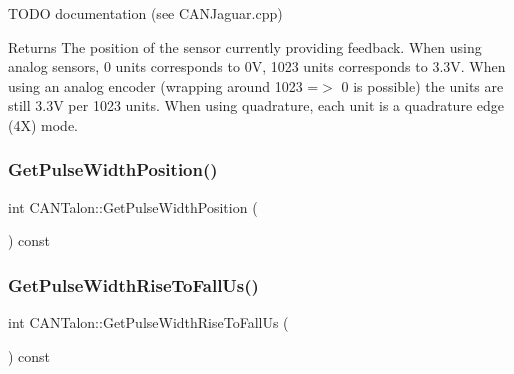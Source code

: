 T\+O\+DO documentation (see C\+A\+N\+Jaguar.\+cpp)

\begin{DoxyReturn}{Returns}
The position of the sensor currently providing feedback. When using analog sensors, 0 units corresponds to 0V, 1023 units corresponds to 3.\+3V. When using an analog encoder (wrapping around 1023 =$>$ 0 is possible) the units are still 3.\+3V per 1023 units. When using quadrature, each unit is a quadrature edge (4X) mode. 
\end{DoxyReturn}
\mbox{\label{class_c_a_n_talon_adf3c68d62c6b246540518de56d7f1d21}} 
\subsubsection{\texorpdfstring{Get\+Pulse\+Width\+Position()}{GetPulseWidthPosition()}}
{\footnotesize\ttfamily int C\+A\+N\+Talon\+::\+Get\+Pulse\+Width\+Position (\begin{DoxyParamCaption}{ }\end{DoxyParamCaption}) const\hspace{0.3cm}{\ttfamily [virtual]}}

\mbox{\label{class_c_a_n_talon_a101348a9f09af22d54806c49e9346979}} 
\subsubsection{\texorpdfstring{Get\+Pulse\+Width\+Rise\+To\+Fall\+Us()}{GetPulseWidthRiseToFallUs()}}
{\footnotesize\ttfamily int C\+A\+N\+Talon\+::\+Get\+Pulse\+Width\+Rise\+To\+Fall\+Us (\begin{DoxyParamCaption}{ }\end{DoxyParamCaption}) const\hspace{0.3cm}{\ttfamily [virtual]}}

\mbox{\label{class_c_a_n_talon_a8a007d31edef41225ddc4d7106d5cf42}} 
